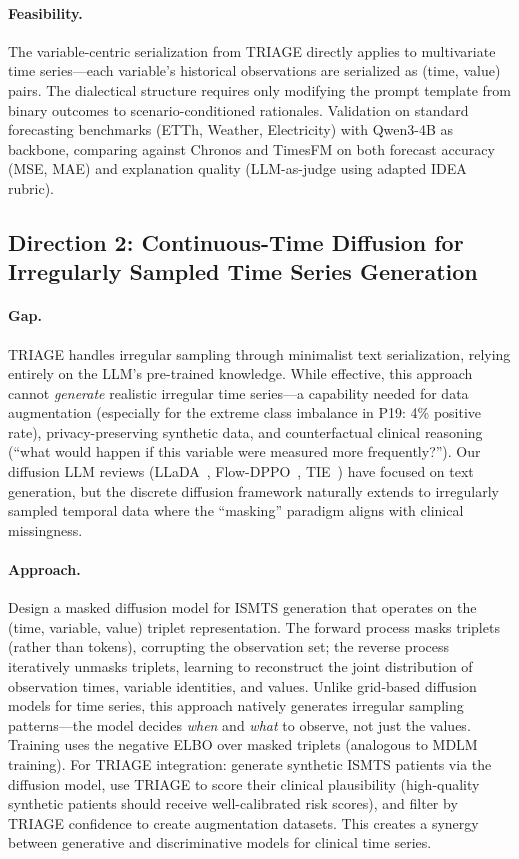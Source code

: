 \documentclass[11pt,a4paper]{article}
\begin{document}
\paragraph{Feasibility.} The variable-centric serialization from TRIAGE directly applies to multivariate time series---each variable's historical observations are serialized as (time, value) pairs. The dialectical structure requires only modifying the prompt template from binary outcomes to scenario-conditioned rationales. Validation on standard forecasting benchmarks (ETTh, Weather, Electricity) with Qwen3-4B as backbone, comparing against Chronos and TimesFM on both forecast accuracy (MSE, MAE) and explanation quality (LLM-as-judge using adapted IDEA rubric).

\subsection{Direction 2: Continuous-Time Diffusion for Irregularly Sampled Time Series Generation}

\paragraph{Gap.} TRIAGE handles irregular sampling through minimalist text serialization, relying entirely on the LLM's pre-trained knowledge. While effective, this approach cannot \emph{generate} realistic irregular time series---a capability needed for data augmentation (especially for the extreme class imbalance in P19: 4\% positive rate), privacy-preserving synthetic data, and counterfactual clinical reasoning (``what would happen if this variable were measured more frequently?''). Our diffusion LLM reviews (LLaDA~\cite{nie2026llada}, Flow-DPPO~\cite{ping2026flowdppo}, TIE~\cite{yun2026tie}) have focused on text generation, but the discrete diffusion framework naturally extends to irregularly sampled temporal data where the ``masking'' paradigm aligns with clinical missingness.

\paragraph{Approach.} Design a masked diffusion model for ISMTS generation that operates on the (time, variable, value) triplet representation. The forward process masks triplets (rather than tokens), corrupting the observation set; the reverse process iteratively unmasks triplets, learning to reconstruct the joint distribution of observation times, variable identities, and values. Unlike grid-based diffusion models for time series, this approach natively generates irregular sampling patterns---the model decides \emph{when} and \emph{what} to observe, not just the values. Training uses the negative ELBO over masked triplets (analogous to MDLM training). For TRIAGE integration: generate synthetic ISMTS patients via the diffusion model, use TRIAGE to score their clinical plausibility (high-quality synthetic patients should receive well-calibrated risk scores), and filter by TRIAGE confidence to create augmentation datasets. This creates a synergy between generative and discriminative models for clinical time series.
\end{document}
